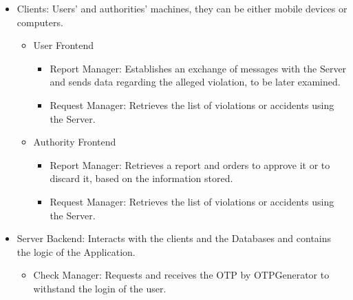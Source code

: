     \begin{itemize}

        \item Clients: Users' and authorities' machines, they 
        can be either mobile devices or computers.
        
        \begin{itemize}

            \item User Frontend

            \begin{itemize}

                \item Report Manager: Establishes an exchange 
                of messages with the Server and sends data 
                regarding the alleged violation, to be 
                later examined.
                
                \item Request Manager: Retrieves the list of 
                violations or accidents using the Server.
                
            \end{itemize}

            \item Authority Frontend

            \begin{itemize}

                \item Report Manager: Retrieves a report and 
                orders to approve it or to discard it, 
                based on the information stored.
                
                \item Request Manager: Retrieves the list 
                of violations or accidents using the Server.
                
            \end{itemize}
            
        \end{itemize}

        \item Server Backend: Interacts with the clients and 
        the Databases and contains the logic of the Application.
        
        \begin{itemize}
            \item Check Manager: Requests and receives the OTP 
            by OTPGenerator to withstand the login of the user.
            

\end{itemize}
\end{itemize}
